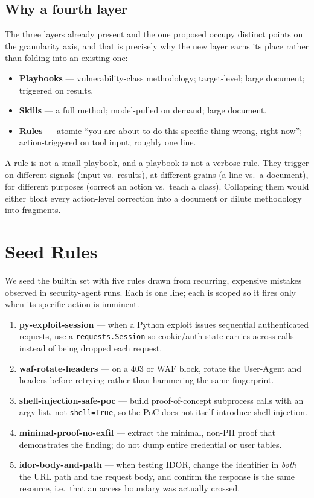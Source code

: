 \documentclass[11pt]{article}
\begin{document}
\subsection{Why a fourth layer}

The three layers already present and the one proposed occupy distinct points on
the granularity axis, and that is precisely why the new layer earns its place
rather than folding into an existing one:

\begin{itemize}[leftmargin=*,itemsep=1pt]
  \item \textbf{Playbooks} --- vulnerability-class methodology; target-level; large document; triggered on results.
  \item \textbf{Skills} --- a full method; model-pulled on demand; large document.
  \item \textbf{Rules} --- atomic ``you are about to do this specific thing wrong, right now''; action-triggered on tool input; roughly one line.
\end{itemize}

A rule is not a small playbook, and a playbook is not a verbose rule. They
trigger on different signals (input vs.\ results), at different grains (a line
vs.\ a document), for different purposes (correct an action vs.\ teach a class).
Collapsing them would either bloat every action-level correction into a document
or dilute methodology into fragments.

\section{Seed Rules}
\label{sec:seed}

We seed the builtin set with five rules drawn from recurring, expensive mistakes
observed in security-agent runs. Each is one line; each is scoped so it fires
only when its specific action is imminent.

\begin{enumerate}[leftmargin=*,itemsep=2pt]
  \item \textbf{py-exploit-session} --- when a Python exploit issues sequential
  authenticated requests, use a \texttt{requests.Session} so cookie/auth state
  carries across calls instead of being dropped each request.
  \item \textbf{waf-rotate-headers} --- on a 403 or WAF block, rotate the
  User-Agent and headers before retrying rather than hammering the same
  fingerprint.
  \item \textbf{shell-injection-safe-poc} --- build proof-of-concept subprocess
  calls with an argv list, not \texttt{shell=True}, so the PoC does not itself
  introduce shell injection.
  \item \textbf{minimal-proof-no-exfil} --- extract the minimal, non-PII proof
  that demonstrates the finding; do not dump entire credential or user tables.
  \item \textbf{idor-body-and-path} --- when testing IDOR, change the identifier
  in \emph{both} the URL path and the request body, and confirm the response is
  the same resource, i.e.\ that an access boundary was actually crossed.
\end{enumerate}
\end{document}
